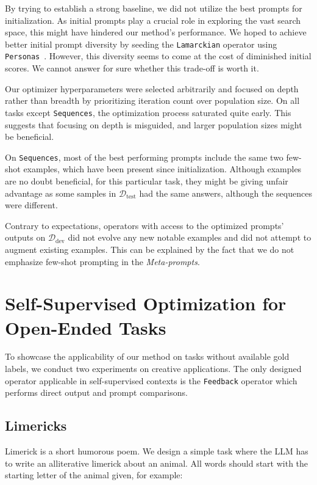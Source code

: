 By trying to establish a strong baseline, we did not utilize the best prompts for initialization. 
As initial prompts play a crucial role\cite{yang2024dualphaseacceleratedpromptoptimization} in exploring the vast search space,
this might have hindered our method's performance. We hoped to achieve better initial prompt diversity by seeding the \texttt{Lamarckian} operator using \texttt{Personas}~\cite{ge2024scalingsyntheticdatacreation}.
However, this diversity seems to come at the cost of diminished initial scores. We cannot answer for sure whether this trade-off is worth it. 

Our optimizer hyperparameters were selected arbitrarily and focused on depth rather than breadth by prioritizing iteration count over population size.
On all tasks except \texttt{Sequences}, the optimization process saturated quite early. This suggests that focusing on depth is misguided,
and larger population sizes might be beneficial.

On \texttt{Sequences}, most of the best performing prompts include the same two few-shot examples, which have been present since initialization.
Although examples are no doubt beneficial, for this particular task, they might be giving unfair advantage as some 
samples in $\mathcal{D}_{\text{test}}$ had the same answers, although the sequences were different. 

Contrary to expectations, operators with access to the optimized prompts' outputs on $\mathcal{D}_{\text{dev}}$ did not evolve any new notable examples 
and did not attempt to augment existing examples. This can be explained by the fact that we do not emphasize few-shot prompting in the \textit{Meta-prompts}.

\section{Self-Supervised Optimization for Open-Ended Tasks}
To showcase the applicability of our method on tasks without available gold labels, we conduct two experiments
on creative applications. The only designed operator applicable in self-supervised contexts is the \texttt{Feedback} 
operator which performs direct output and prompt comparisons.

\subsection{Limericks}
Limerick is a short humorous poem. We design a simple task where the LLM has to write an alliterative limerick about an animal. 
All words should start with the starting letter of the animal given, for example:

